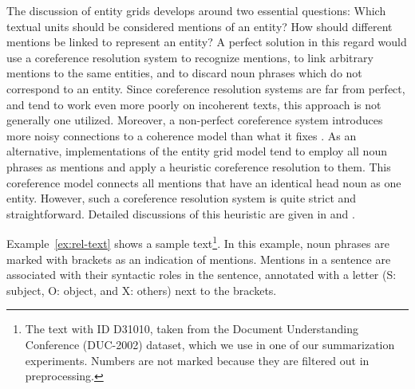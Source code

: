 The discussion of entity grids develops around two essential questions: Which textual units should be considered mentions of an entity? How should different mentions be linked to represent an entity? 
A perfect solution in this regard would use a coreference resolution system to recognize mentions, to link arbitrary mentions to the same entities, and to discard noun phrases which do not correspond to an entity. 
Since coreference resolution systems are far from perfect, and tend to work even more poorly on incoherent texts, this approach is not generally one utilized.  
Moreover, a non-perfect coreference system introduces more noisy connections to a coherence model than what it fixes \cite{barzilay08}.  
As an alternative, implementations of the entity grid model tend to employ all noun phrases as mentions and apply a heuristic coreference resolution to them.  
This coreference model connects all mentions that have an identical head noun as one entity. 
However, such a coreference resolution system is quite strict and straightforward. 
Detailed discussions of this heuristic are given in  and . 

Example~\ref{ex:rel-text} shows a sample text\footnote{The text with ID D31010, taken from the Document Understanding Conference (DUC-2002) dataset, which we use in one of our summarization experiments. Numbers are not marked because they are filtered out in preprocessing.}.  
In this example, noun phrases are marked with brackets as an indication of mentions. 
Mentions in a sentence are associated with their syntactic roles in the sentence, annotated with a letter (S: subject, O: object, and X: others) next to the brackets. 

